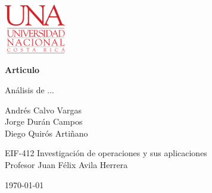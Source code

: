 \documentclass[11pt, article, natbib]{article}
\begin{document}
\begin{titlepage}
	\includegraphics[width=0.2\textwidth]{../../logo-UNA blanco.png}
   	\begin{changemargin}{4.5cm}{0cm}
       	\textbf{\huge Articulo}

       	\vspace{0.2cm}
       	\LARGE Análisis de ...
            
       	\vspace{3cm}
		\Large
        Andrés Calvo Vargas \\
        Jorge Durán Campos \\
       	Diego Quirós Artiñano \\ 

       	\vspace{3cm}
       
		EIF-412 Investigación de operaciones y sus aplicaciones \\
       	Profesor Juan Félix Avila Herrera \\

       	\vfill
    	
		\today
	\end{changemargin}
 \begin{abstract}
    \blindtext[1]
\end{abstract}
\end{titlepage}

\onecolumn
    \renewcommand{\contentsname}{\large Índice \\ \hrulefill}
\newpage

\twocolumn
\blinddocument
\newpage
\onecolumn

\nocite{temp}
\nocite{greenwade93}
\nocite{Griffiths:1492149}
%  
% 
\printbibliography
\end{document}
